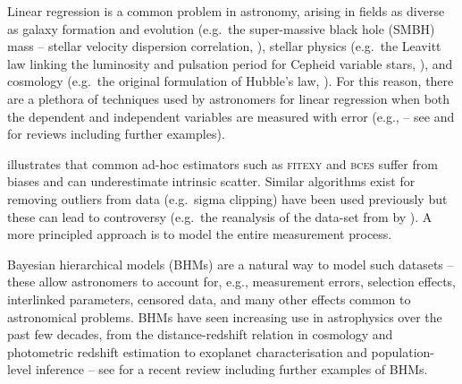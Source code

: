 \documentclass[fleqn,usenatbib]{rasti}
\begin{document}




Linear regression is a common problem in astronomy, arising in fields as diverse
as galaxy formation and evolution (e.g.\ the super-massive black hole (SMBH)
mass -- stellar velocity dispersion correlation, \citealt{Ferrarese:2000,
Gebhardt:2000}), stellar physics (e.g.\ the Leavitt law linking the luminosity
and pulsation period for Cepheid variable stars, \citealt{Leavitt:1912}), and
cosmology (e.g.\ the original formulation of Hubble's law,
\citealt{Hubble:1929}). For this reason, there are a plethora of techniques used
by astronomers for linear regression when both the dependent and independent
variables are measured with error (e.g., \citealt{Press:1992, Akritas:1996,
Tremaine:2002, Kelly:2007} -- see \citealt{Andreon:2013} and
\citealt{Andreon:2015} for reviews including further examples).

\citet{Kelly:2007} illustrates that common ad-hoc estimators such as
\textsc{fitexy} \citep{Press:1992, Tremaine:2002} and \textsc{bces}
\citep{Akritas:1996} suffer from biases and can underestimate intrinsic scatter.
Similar algorithms exist for removing outliers from data (e.g.\ sigma clipping)
have been used previously but these can lead to controversy (e.g.\ the
reanalysis of the data-set from \citealt{Riess:2011} by
\citealt{Efstathiou:2014}). A more principled approach is to model the entire
measurement process.

Bayesian hierarchical models (BHMs) are a natural way to model such datasets --
these allow astronomers to account for, e.g., measurement errors, selection
effects, interlinked parameters, censored data, and many other effects common to
astronomical problems. BHMs have seen increasing use in astrophysics over the
past few decades, from the distance-redshift relation in cosmology
\citep[e.g.][]{Feeney:2018, Avelino:2019} and photometric redshift estimation
\citep[e.g.][]{Leistedt:2016} to exoplanet characterisation
\citep[e.g.][]{Sestovic:2018} and population-level inference
\citep[e.g.][]{Kelly:2009} -- see \citet{Feigelson:2021} for a recent review
including further examples of BHMs.
\end{document}
